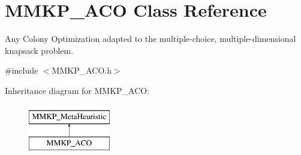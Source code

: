 \hypertarget{class_m_m_k_p___a_c_o}{\section{M\+M\+K\+P\+\_\+\+A\+C\+O Class Reference}
\label{class_m_m_k_p___a_c_o}
}


Any Colony Optimization adapted to the multiple-\/choice, multiple-\/dimensional knapsack problem.  




{\ttfamily \#include $<$M\+M\+K\+P\+\_\+\+A\+C\+O.\+h$>$}

Inheritance diagram for M\+M\+K\+P\+\_\+\+A\+C\+O\+:\begin{figure}[H]
\begin{center}
\leavevmode
\includegraphics[height=2.000000cm]{class_m_m_k_p___a_c_o}
\end{center}
\end{figure}
